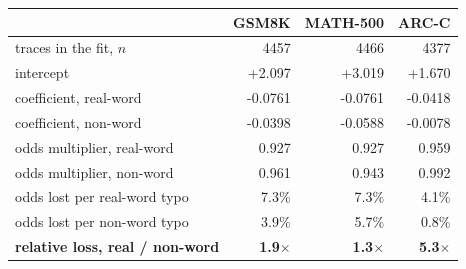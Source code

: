 \begin{tabular}{lrrr}
\toprule
& \textbf{GSM8K} & \textbf{MATH-500} & \textbf{ARC-C} \\
\midrule
traces in the fit, $n$ & 4457 & 4466 & 4377 \\
intercept & +2.097 & +3.019 & +1.670 \\
coefficient, real-word & -0.0761 & -0.0761 & -0.0418 \\
coefficient, non-word & -0.0398 & -0.0588 & -0.0078 \\
odds multiplier, real-word & 0.927 & 0.927 & 0.959 \\
odds multiplier, non-word & 0.961 & 0.943 & 0.992 \\
odds lost per real-word typo & 7.3\% & 7.3\% & 4.1\% \\
odds lost per non-word typo & 3.9\% & 5.7\% & 0.8\% \\
\midrule
\textbf{relative loss, real / non-word} & \textbf{1.9$\times$} & \textbf{1.3$\times$} & \textbf{5.3$\times$} \\
\bottomrule
\end{tabular}